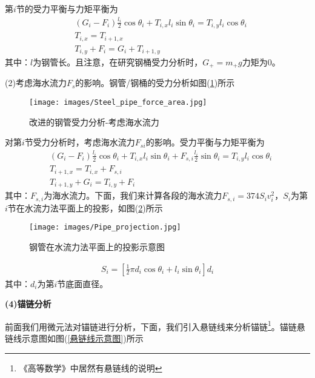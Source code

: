             \par
            第$i$节的受力平衡与力矩平衡为
            \begin{align*}
            & (G_i - F_i)\frac{l_i}{2}\cos\theta_i+T_{i,x}l_i\sin\theta_i = T_{i,y}l_i\cos\theta_i\\
            & T_{i,x} = T_{i+1,x}\\
            & T_{i,y} + F_i = G_i + T_{i+1,y}
            \end{align*}
            其中：$l$为钢管长。且注意，在研究钢桶受力分析时，$G_+ = m_+g$力矩为0。
            \par
            (2)考虑海水流力$F_s$的影响。钢管/钢桶的受力分析如图(\ref{改进的钢管受力分析-考虑海水流力})所示
            \begin{figure}[H]
            \centering
            \texttt{[image: images/Steel\_pipe\_force\_area.jpg]}
            \caption{改进的钢管受力分析-考虑海水流力}
            \label{改进的钢管受力分析-考虑海水流力}
            \end{figure}
            对第$i$节受力分析时，考虑海水流力$F_{si}$的影响。受力平衡与力矩平衡为
            \begin{align*}
            & (G_i-F_i)\frac{l_i}{2}\cos\theta_i+T_{i,x}l_i\sin \theta_i+F_{s,i}\frac{l_i}{2}\sin \theta_i = T_{i,y}l_i\cos\theta_i\\
            & T_{i+1,x} = T_{i,x}+F_{s,i}\\
            & T_{i+1,y}+G_i = T_{i,y}+F_i
            \end{align*}
            其中：$F_{s,i}$为海水流力。下面，我们来计算各段的海水流力$F_{s,i} = 374S_i v_i^2$，$S_i$为第$i$节在水流力法平面上的投影，如图(\ref{钢管在水流力法平面上的投影示意图})所示
            \begin{figure}[H]
            \centering
            \texttt{[image: images/Pipe\_projection.jpg]}
            \caption{钢管在水流力法平面上的投影示意图}
            \label{钢管在水流力法平面上的投影示意图}
            \end{figure}
            \begin{align*}
            S_i = \left[ \frac{1}{2}\pi d_i\cos\theta_i+l_i\sin\theta_i \right]d_i
            \end{align*}
            其中：$d_i$为第$i$节底面直径。
            \par
            \textbf{(4)锚链分析}
            \par
            前面我们用微元法对锚链进行分析，下面，我们引入悬链线来分析锚链\footnote{《高等数学》中居然有悬链线的说明}。锚链悬链线示意图如图(\ref{悬链线示意图})所示
